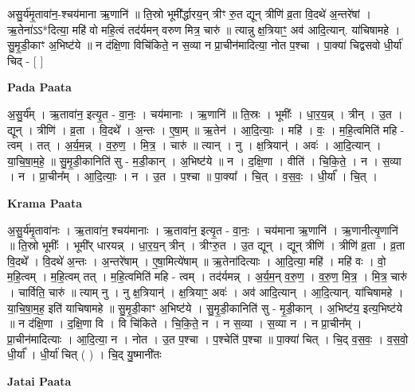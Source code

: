 \documentclass[17pt]{extarticle}
\begin{document}
असु॒र्य॑मृ॒तावा॑न॒-श्चय॑माना ऋ॒णानि॑ ॥ ति॒स्रो भूमी᳚र्द्धारय॒न् त्रीꣳ रु॒त द्यून् त्रीणि॑ व्र॒ता वि॒दथे॑ अ॒न्तरे॑षां । ऋ॒तेना॑ऽऽ*दित्या॒ महि॑ वो महि॒त्वं तद॑र्यमन् वरुण मित्र॒ चारु॑ ॥ त्यान्नु क्ष॒त्रियाꣳ॒॒ अव॑ आदि॒त्यान्. या॑चिषामहे । सु॒मृ॒डी॒काꣳ अ॒भिष्ट॑ये ॥ न द॑क्षि॒णा विचि॑किते॒ न स॒व्या न प्रा॒चीन॑मादित्या॒ नोत प॒श्चा । पा॒क्या॑ चिद्वसवो धी॒र्या॑ चिद् - [  ] \newline

\textbf{Pada Paata} \newline

अ॒सु॒र्य᳚म् । ऋ॒तावा॑न॒ इत्यृ॒त - वा॒नः॒ । चय॑मानाः । ऋ॒णानि॑ ॥ ति॒स्रः । भूमीः᳚ । धा॒र॒य॒न्न् । त्रीन् । उ॒त । द्यून् । त्रीणि॑ । व्र॒ता । वि॒दथे᳚ । अ॒न्तः । ए॒षा॒म् ॥ ऋ॒तेन॑ । आ॒दि॒त्याः॒ । महि॑ । वः॒ । म॒हि॒त्वमिति॑ महि - त्वम् । तत् । अ॒र्य॒म॒न्न् । व॒रु॒ण॒ । मि॒त्र॒ । चारु॑ ॥ त्यान् । नु । क्ष॒त्रियान्॑ । अवः॑ । आ॒दि॒त्यान् । या॒चि॒षा॒म॒हे॒ ॥ सु॒मृ॒डी॒कानिति॑ सु - म॒डी॒कान् । अ॒भिष्ट॑ये ॥ न । द॒क्षि॒णा । वीति॑ । चि॒कि॒ते॒ । न । स॒व्या । न । प्रा॒चीन᳚म् । आ॒दि॒त्याः॒ । न । उ॒त । प॒श्चा ॥ पा॒क्या᳚ । चि॒त् । व॒स॒वः॒ । धी॒र्या᳚ । चि॒त् ।  \newline


\textbf{Krama Paata} \newline

अ॒सु॒र्य॑मृ॒तावा॑नः । ऋ॒तावा॑न॒ श्चय॑मानाः । ऋ॒तावा॑न॒ इत्यृ॒त - वा॒नः॒ । चय॑माना ऋ॒णानि॑ । ऋ॒णानीत्यृ॒णानि॑ ॥ ति॒स्रो भूमीः᳚ । भूमी᳚र् धारयन्न् । धा॒र॒य॒न् त्रीन् । त्रीꣳरु॒त । उ॒त द्यून् । द्यून् त्रीणि॑ । त्रीणि॑ व्र॒ता । व्र॒ता वि॒दथे᳚ । वि॒दथे॑ अ॒न्तः । अ॒न्तरे॑षाम् । ए॒षा॒मित्ये॑षाम् ॥ ऋ॒तेना॑दित्याः । आ॒दि॒त्या॒ महि॑ । महि॑ वः । वो॒ म॒हि॒त्वम् । म॒हि॒त्वम् तत् । म॒हि॒त्वमिति॑ महि - त्वम् । तद॑र्यमन्न् । अ॒र्य॒म॒न् व॒रु॒ण॒ । व॒रु॒ण॒ मि॒त्र॒ । मि॒त्र॒ चारु॑ । चार्विति॒ चारु॑ ॥ त्याम् नु । नु क्ष॒त्रियान्॑ । क्ष॒त्रियाꣳ॒॒ अवः॑ । अव॑ आदि॒त्यान् । आ॒दि॒त्यान्. या॑चिषामहे । या॒चि॒षा॒म॒ह॒ इति॑ याचिषामहे ॥ सु॒मृ॒डी॒काꣳ अ॒भिष्ट॑ये । सु॒मृ॒डी॒कानिति॑ सु - मृ॒डी॒कान् । अ॒भिष्ट॑य॒ इत्य॒भिष्ट॑ये ॥ न द॑क्षि॒णा । द॒क्षि॒णा वि । वि चि॑किते । चि॒कि॒ते॒ न । न स॒व्या । स॒व्या न । न प्रा॒चीन᳚म् । प्रा॒चीन॑मादित्याः । आ॒दि॒त्या॒ न । नोत । उ॒त प॒श्चा । प॒श्चेति॑ प॒श्चा ॥ पा॒क्या॑ चित् । चि॒द् व॒स॒वः॒ । व॒स॒वो॒ धी॒र्या᳚ । धी॒र्या॑ चित् ( ) । चि॒द् यु॒ष्मानी॑तः \newline

\textbf{Jatai Paata} \newline
\end{document}
